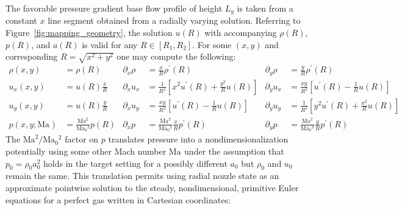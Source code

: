 \documentclass[letterpaper,11pt,nointlimits,reqno]{amsart}
\newcommand{\Mach}[1][]{\mbox{Ma}_{#1}}
\begin{document}
The favorable pressure gradient base flow profile of height $L_y$ is taken from
a constant $x$ line segment obtained from a radially varying solution.
Referring to Figure~\eqref{fig:mapping_geometry}, the solution
$u\!\left(R\right)$ with accompanying $\rho\!\left(R\right)$,
$p\!\left(R\right)$, and $a\!\left(R\right)$ is valid for any
$R\in\left[R_1,R_2\right]$.  For some $\left(x,y\right)$ and corresponding
$R=\sqrt{x^2+y^2}$ one may compute the following:
%
\begin{align}
              \rho \!\left(x, y\right)        &= \rho\!\left(R\right)
 & \partial_x \rho                            &= \frac{x}{R} \rho^\prime\!\left(R\right)
 & \partial_y \rho                            &= \frac{y}{R} \rho^\prime\!\left(R\right)
\\            u_x  \!\left(x, y\right)        &= u   \!\left(R\right) \frac{x}{R}
 & \partial_x u_x                             &= \frac{1}{R^2}\left[x^2 u^\prime\!\left(R\right) + \frac{y^2}{R} u\!\left(R\right)\right]
 & \partial_y u_x                             &= \frac{xy}{R^2}\left[u^\prime\!\left(R\right) - \frac{1}{R}u\!\left(R\right)\right]
\\            u_y  \!\left(x, y\right)        &= u   \!\left(R\right) \frac{y}{R}
 & \partial_x u_y                             &= \frac{xy}{R^2}\left[u^\prime\!\left(R\right) - \frac{1}{R}u\!\left(R\right)\right]
 & \partial_y u_y                             &= \frac{1}{R^2}\left[y^2 u^\prime\!\left(R\right) + \frac{x^2}{R} u\!\left(R\right)\right]
\\            p    \!\left(x, y; \Mach\right) &= \frac{\Mach^2}{\Mach[0]{}^2} p   \!\left(R\right)
 & \partial_x p                               &= \frac{\Mach^2}{\Mach[0]{}^2}\frac{x}{R} p^\prime\!\left(R\right)
 & \partial_y p                               &= \frac{\Mach^2}{\Mach[0]{}^2}\frac{y}{R} p^\prime\!\left(R\right)
\end{align}
%
The $\Mach^2/\Mach[0]{}^2$ factor on $p$ translates pressure into a
nondimensionalization potentially using some other Mach number $\Mach$ under
the assumption that $p_0 = \rho_0 a_0^2$ holds in the target setting for a
possibly different $a_0$ but $\rho_0$ and $u_0$ remain the same.  This
translation permits using radial nozzle state as an approximate pointwise
solution to the steady, nondimensional, primitive Euler equations for a perfect
gas written in Cartesian coordinates:
%
\end{document}
